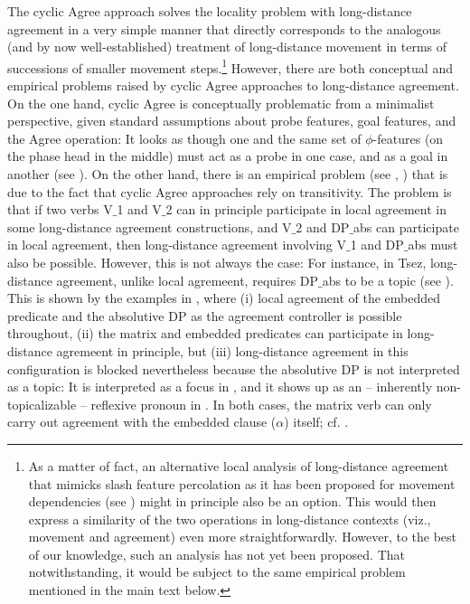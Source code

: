 \documentclass[output=paper
,modfonts
,nonflat]{langsci/langscibook}
\begin{document}
The cyclic Agree approach solves the locality problem with
long-distance agreement in a very simple manner that directly
corresponds to the analogous (and by now well-established) treatment
of long-distance movement in terms of successions of smaller movement
steps.\footnote{As a matter of fact, an alternative local analysis of
  long-distance agreement that mimicks {\sc slash} feature percolation
  as it has been proposed for movement dependencies (see
  \cite{Gazdar:81}) might in principle also be an option. This would
  then express a similarity of the two operations in long-distance
  contexts (viz., movement and agreement) even more
  straightforwardly. However, to the best of our knowledge, such an
  analysis has not yet been proposed. That notwithstanding, it would
  be subject to the same empirical problem mentioned in the main text
  below.}  However, there are both conceptual and empirical problems
raised by cyclic Agree approaches to long-distance agreement. On the
one hand, cyclic Agree is conceptually problematic from a minimalist
perspective, given standard assumptions about probe features, goal
features, and the Agree operation: It looks as though one and the same
set of $\phi$-features (on the phase head in the middle) must act as a
probe in one case, and as a goal in another (see \cite{Bhatt:05}). On
the other hand, there is an empirical problem (see
\cite{Polinsky&Potsdam:01}, \cite{Bhatt&Keine:16:lon}) that is due to the
fact that cyclic Agree approaches rely on transitivity. The problem is
that if two verbs V$\_$1 and V$\_$2 can in principle participate in local
agreement in some long-distance agreement constructions, and V$\_$2 and
DP$\_${abs} can participate in local agreement, then long-distance
agreement involving V$\_$1 and DP$\_${abs} must also be possible. However,
this is not always the  case: For instance,  in Tsez, long-distance
agreement, unlike local agremeent, requires DP$\_${abs} to
be a topic (see \cite{Polinsky&Potsdam:01}). This is shown by the
examples in \Next, where (i) local agreement of the embedded predicate and
the absolutive DP as the agreement controller is possible throughout,
(ii) the matrix and embedded predicates can participate in
long-distance agremeent in principle, but (iii) long-distance
agreement in this configuration is blocked nevertheless because the
absolutive DP is not interpreted as a topic: It is interpreted as a
focus in \Next[a], and it shows up as an -- inherently
non-topicalizable -- reflexive pronoun in \Next[c]. In both cases, the
matrix verb can only carry out agreement with the embedded clause
($\alpha$) itself; cf. \Next[bd]. 
\end{document}
